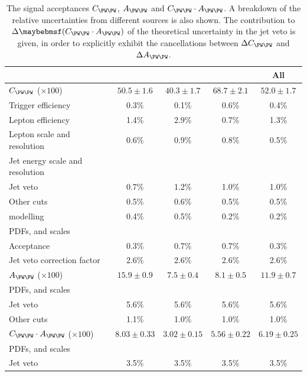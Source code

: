 \begin{table}[p]
	\begin{tabular}{l@{}c@{\hskip 0.2in}c@{\hskip 0.2in}c@{\hskip 0.2in}c}
		\toprule
		& \emch & \eech & \mmch & All \\
		\midrule
		$C_{\WW}$ ($\times 100$) & $50.5\pm1.6$ & $40.3\pm1.7$ & $68.7\pm2.1$ & $52.0\pm1.7$ \\
		\quad Trigger efficiency & 0.3\% & 0.1\% & 0.6\% & 0.4\% \\
		\quad Lepton efficiency  & 1.4\% & 2.9\% & 0.7\% & 1.3\% \\
		\quad Lepton \pt scale and resolution & 0.6\% & 0.9\% & 0.8\% & 0.5\% \\
		\quad Jet energy scale and resolution \\
		\quad\quad Jet veto      & 0.7\% & 1.2\% & 1.0\% & 1.0\% \\
		\quad\quad Other cuts    & 0.5\% & 0.6\% & 0.5\% & 0.5\% \\
		\quad \met modelling     & 0.4\% & 0.5\% & 0.2\% & 0.2\% \\
		\quad PDFs, \mur and \muf scales \\
		\quad\quad Acceptance    & 0.3\% & 0.7\% & 0.7\% & 0.3\% \\
		\quad\quad Jet veto correction factor & 2.6\% & 2.6\% & 2.6\% & 2.6\% \\
		\cmidrule(lr){1-5}
		$A_{\WW}$ ($\times 100$) & $15.9\pm0.9$ & $7.5\pm0.4$ & $8.1\pm0.5$ & $11.9\pm0.7$ \\
		\quad PDFs, \mur and \muf scales \\
		\quad\quad Jet veto   & 5.6\% & 5.6\% & 5.6\% & 5.6\% \\
		\quad\quad Other cuts & 1.1\% & 1.0\% & 1.0\% & 1.0\% \\
		\cmidrule(lr){1-5}
		$C_{\WW} \cdot A_{\WW}$ ($\times 100$) & $8.03\pm0.33$ & $3.02\pm0.15$ & $5.56\pm0.22$ & $6.19\pm0.25$ \\
		\quad PDFs, \mur and \muf scales \\
		\quad\quad Jet veto   & 3.5\% & 3.5\% & 3.5\% & 3.5\% \\
		\bottomrule
	\end{tabular}
	\caption{The signal acceptances $C_{\WW}$, $A_{\WW}$ and $C_{\WW} \cdot A_{\WW}$. 
	A breakdown of the relative uncertainties from different sources is also shown. The 
	contribution to $\Delta \parenths{C_{\WW} \cdot A_{\WW}}$ of the theoretical 
	uncertainty in the jet veto is given, in order to explicitly exhibit the 
	cancellations between $\Delta C_{\WW}$ and $\Delta A_{\WW}$.}
	\label{tab:ww:cww_aww}
\end{table}



